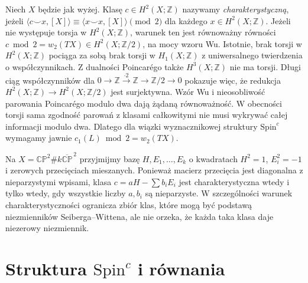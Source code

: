 \begin{definicja}
Niech $X$ będzie jak wyżej. Klasę $c\in H^2(X;\mathbb Z)$
nazywamy \emph{charakterystyczną}, jeżeli
$\langle c\smile x,[X]\rangle\equiv
\langle x\smile x,[X]\rangle\pmod2$
dla każdego $x\in H^2(X;\mathbb Z)$.
Jeżeli nie występuje torsja w $H^2(X;\mathbb Z)$,
warunek ten jest równoważny równości
$c\bmod2=w_2(TX)\in H^2(X;\mathbb Z/2)$,
na mocy wzoru Wu. Istotnie, brak torsji w $H^2(X;\mathbb Z)$
pociąga za sobą brak torsji w $H_1(X;\mathbb Z)$
z uniwersalnego twierdzenia o współczynnikach.
Z dualności Poincarégo także $H^3(X;\mathbb Z)$
nie ma torsji. Długi ciąg współczynników dla
$0\to\mathbb Z\xrightarrow{\cdot2}\mathbb Z
\to\mathbb Z/2\to0$ pokazuje więc, że redukcja
$H^2(X;\mathbb Z)\to H^2(X;\mathbb Z/2)$
jest surjektywna. Wzór Wu i nieosobliwość
parowania Poincarégo modulo dwa dają żądaną
równoważność. W obecności torsji sama zgodność
parowań z klasami całkowitymi nie musi wykrywać całej
informacji modulo dwa. Dlatego dla wiązki wyznacznikowej
struktury $\mathrm{Spin}^c$ wymagamy jawnie
$c_1(L)\bmod2=w_2(TX)$.
\end{definicja}

\begin{przyklad}
Na $X=\mathbb{CP}^2\#k\overline{\mathbb{CP}}^{\,2}$
przyjmijmy bazę $H,E_1,\ldots,E_k$ o kwadratach
$H^2=1$, $E_i^2=-1$ i zerowych przecięciach mieszanych.
Ponieważ macierz przecięcia jest diagonalna z nieparzystymi
wpisami, klasa $c=aH-\sum b_iE_i$ jest charakterystyczna
wtedy i tylko wtedy, gdy wszystkie liczby $a,b_i$ są
nieparzyste. W szczególności warunek charakterystyczności
ogranicza zbiór klas, które mogą być podstawą
niezmienników Seiberga--Wittena, ale nie orzeka,
że każda taka klasa daje niezerowy niezmiennik.
\end{przyklad}

\section{Struktura \texorpdfstring{$\mathrm{Spin}^c$}{Spinc} i równania}
\label{sec:tg-sw-equations}

